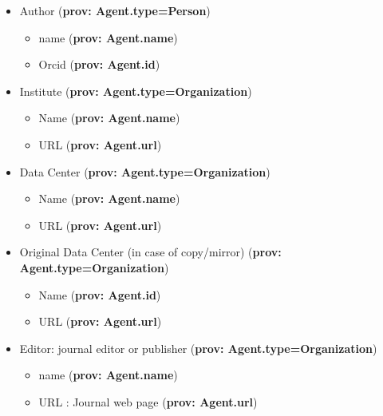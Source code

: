 \documentclass[11pt,a4paper]{ivoa}
\begin{document}
\begin{itemize}
    \item Author (\textbf{prov: Agent.type=Person})
    \begin{itemize}
		\item name (\textbf{prov: Agent.name})
		\item Orcid (\textbf{prov: Agent.id})
	\end{itemize}
	\item Institute (\textbf{prov: Agent.type=Organization})
    \begin{itemize}
		\item Name (\textbf{prov: Agent.name})
		\item URL (\textbf{prov: Agent.url})
	\end{itemize}
	\item Data Center (\textbf{prov: Agent.type=Organization})
	\begin{itemize}
		\item Name (\textbf{prov: Agent.name})
		\item URL (\textbf{prov: Agent.url})
	\end{itemize}
	\item Original Data Center (in case of copy/mirror) (\textbf{prov: Agent.type=Organization})
	\begin{itemize}
		\item Name (\textbf{prov: Agent.id})
		\item URL (\textbf{prov: Agent.url})
	\end{itemize}
	\item Editor: journal editor or publisher  (\textbf{prov: Agent.type=Organization})
	\begin{itemize}
		\item name (\textbf{prov: Agent.name})
		\item URL :  Journal web page (\textbf{prov: Agent.url}) 
	\end{itemize}
\end{itemize}
\end{document}
